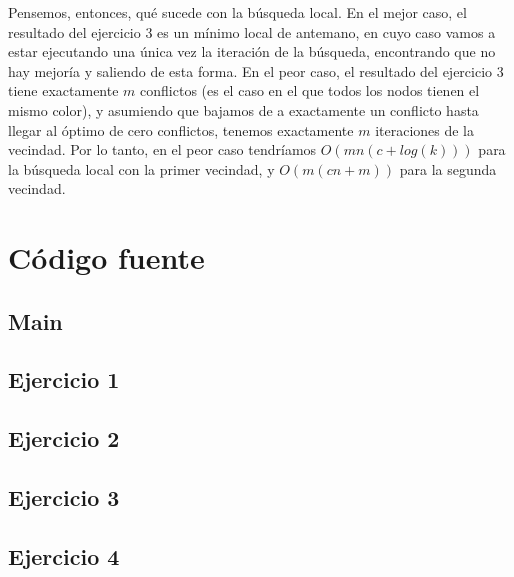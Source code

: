 \documentclass{article}
\theoremstyle{definition}
\theoremstyle{remark}
\begin{document}
Pensemos, entonces, qué sucede con la búsqueda local. En el mejor caso, el resultado del ejercicio 3 es un mínimo local de antemano, en cuyo caso vamos a estar ejecutando una única vez la iteración de la búsqueda, encontrando que no hay mejoría y saliendo de esta forma. En el peor caso, el resultado del ejercicio 3 tiene exactamente $m$ conflictos (es el caso en el que todos los nodos tienen el mismo color), y asumiendo que bajamos de a exactamente un conflicto hasta llegar al óptimo de cero conflictos, tenemos exactamente $m$ iteraciones de la vecindad. Por lo tanto, en el peor caso tendríamos $O(mn(c + log(k)))$ para la búsqueda local con la primer vecindad, y $O(m(cn + m))$ para la segunda vecindad.

\section{Código fuente}

\lstset{inputencoding=utf8/latin1}
\lstset{basicstyle=\footnotesize\ttfamily,breaklines=true}
\lstset{framextopmargin=50pt,frame=bottomline}

\subsection{Main}
%

\subsection{Ejercicio 1}
%
%

\subsection{Ejercicio 2}
%
%

\subsection{Ejercicio 3}
%
%

\subsection{Ejercicio 4}
\end{document}
